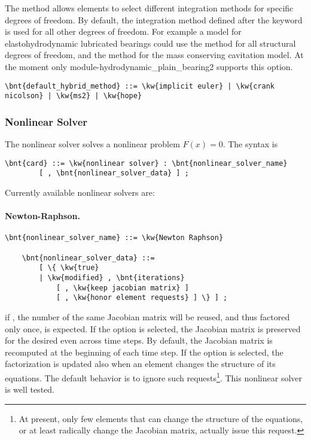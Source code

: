 The  method allows elements to select different integration methods for specific degrees of freedom.
By default, the integration method defined after the  keyword is used for all other degrees of freedom.
For example a model for elastohydrodynamic lubricated bearings could use the  method for all structural
degrees of freedom, and the  method for the mass conserving cavitation model.
At the moment only module-hydrodynamic\_plain\_bearing2 supports this option.

\begin{Verbatim}[commandchars=\\\{\}]
    \bnt{default_hybrid_method} ::= \kw{implicit euler} | \kw{crank nicolson} | \kw{ms2} | \kw{hope}
\end{Verbatim}

\subsubsection{Nonlinear Solver}
The nonlinear solver solves a nonlinear problem $F(x)=0$.
The syntax is
\begin{Verbatim}[commandchars=\\\{\}]
    \bnt{card} ::= \kw{nonlinear solver} : \bnt{nonlinear_solver_name}
        [ , \bnt{nonlinear_solver_data} ] ;
\end{Verbatim}
Currently available nonlinear solvers are:

\paragraph{Newton-Raphson.}
\begin{Verbatim}[commandchars=\\\{\}]
    \bnt{nonlinear_solver_name} ::= \kw{Newton Raphson}

    \bnt{nonlinear_solver_data} ::=
        [ \{ \kw{true}
        | \kw{modified} , \bnt{iterations}
            [ , \kw{keep jacobian matrix} ]
            [ , \kw{honor element requests} ] \} ] ;
\end{Verbatim}
if , the number of  the same Jacobian matrix 
will be reused, and thus factored only once, is expected.
If the option  is selected,
the Jacobian matrix is preserved
for the desired  even across time steps.
By default, the Jacobian matrix is recomputed at the beginning 
of each time step.
If the option  is selected, the factorization
is updated also when an element changes the structure of its equations.
The default behavior is to ignore such requests\footnote{
	At present, only few elements that can change the structure
	of the equations, or at least radically change the Jacobian matrix,
	actually issue this request.
}.
This nonlinear solver is well tested.

